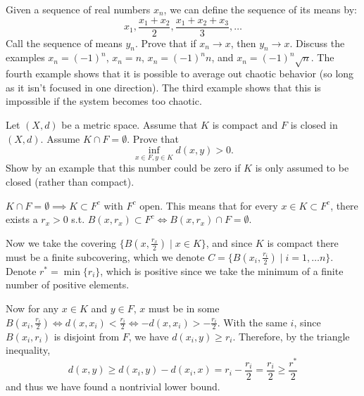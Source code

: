   \begin{exercise}
    Given a sequence of real numbers $x_n$, we can define the sequence of its means by:
    \begin{equation}
      x_1, \frac{x_1 + x_2}{2}, \frac{x_1 + x_2 + x_3}{3}, \ldots
    \end{equation}
    Call the sequence of means $y_n$. Prove that if $x_n \to x$, then $y_n \to x$. Discuss the examples $x_n = (-1)^n$, $x_n = n$, $x_n = (-1)^n n$, and $x_n = (-1)^n\sqrt{n}$. The fourth example shows that it is possible to average out chaotic behavior (so long as it isn't focused in one direction). The third example shows that this is impossible if the system becomes too chaotic.
  \end{exercise}
  \begin{solution}
    
  \end{solution}

  \begin{exercise}
    \label{ex:compact-closed-dist}
    Let $(X,d)$ be a metric space. Assume that $K$ is compact and $F$ is closed in $(X,d)$. Assume $K \cap F = \emptyset$. Prove that
    \begin{equation}
      \inf_{x \in F, y \in K} d(x,y) > 0.
    \end{equation}
    Show by an example that this number could be zero if $K$ is only assumed to be closed (rather than compact).
  \end{exercise}
  \begin{solution}
    $K \cap F = \emptyset \implies K \subset F^c$ with $F^c$ open. This means that for every $x \in K \subset F^c$, there exists a $r_x > 0$ s.t. $B(x, r_x) \subset F^c \iff B(x, r_x) \cap F = \emptyset$. 

    Now we take the covering $\{B(x, \frac{r_x}{2}) \mid x \in K\}$, and since $K$ is compact there must be a finite subcovering, which we denote $C = \{B(x_i, \frac{r_i}{2}) \mid i = 1, \ldots n \}$. Denote $r^\ast = \min\{r_i\}$, which is positive since we take the minimum of a finite number of positive elements. 

    Now for any $x \in K$ and $y \in F$, $x$ must be in some $B(x_i, \frac{r_i}{2}) \iff d(x, x_i) < \frac{r_i}{2} \iff -d(x, x_i) > - \frac{r_i}{2}$. With the same $i$, since $B(x_i, r_i)$ is disjoint from $F$, we have $d(x_i, y) \geq r_i$. Therefore, by the triangle inequality, 
    \begin{equation}
      d(x, y) \geq d(x_i, y) - d(x_i, x) = r_i - \frac{r_i}{2} = \frac{r_i}{2} \geq \frac{r^\ast}{2}
    \end{equation}
    and thus we have found a nontrivial lower bound. 
  \end{solution}

